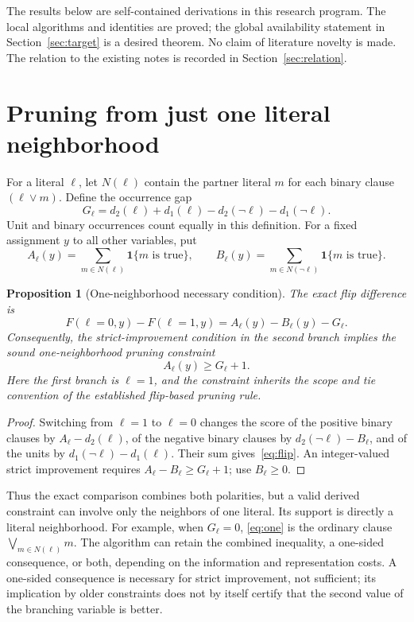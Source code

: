 \documentclass[11pt,a4paper]{article}
\newtheorem{proposition}[theorem]{Proposition}
\theoremstyle{definition}
\newcommand{\ind}[1]{\mathbf 1\{#1\}}
\begin{document}
The results below are self-contained derivations in this research program.
The local algorithms and identities are proved; the global availability
statement in Section~\ref{sec:target} is a desired theorem. No claim of
literature novelty is made. The relation to the existing notes is recorded
in Section~\ref{sec:relation}.

\section{Pruning from just one literal neighborhood}\label{sec:one}

For a literal $\ell$, let $N(\ell)$ contain the partner literal $m$ for
each binary clause $(\ell\lor m)$. Define the occurrence gap
\begin{equation}
 G_\ell=d_2(\ell)+d_1(\ell)-d_2(\neg\ell)-d_1(\neg\ell).
 \label{eq:gap}
\end{equation}
Unit and binary occurrences count equally in this definition. For a fixed
assignment $y$ to all other variables, put
\[
 A_\ell(y)=\sum_{m\in N(\ell)}\ind{m\text{ is true}},\qquad
 B_\ell(y)=\sum_{m\in N(\neg\ell)}\ind{m\text{ is true}}.
\]

\begin{proposition}[One-neighborhood necessary condition]\label{prop:one}
The exact flip difference is
\begin{equation}
 F(\ell=0,y)-F(\ell=1,y)=A_\ell(y)-B_\ell(y)-G_\ell.
 \label{eq:flip}
\end{equation}
Consequently, the strict-improvement condition in the second branch
implies the sound one-neighborhood pruning constraint
\begin{equation}
 \boxed{A_\ell(y)\ge G_\ell+1.} \label{eq:one}
\end{equation}
Here the first branch is $\ell=1$, and the constraint inherits the scope
and tie convention of the established flip-based pruning rule.
\end{proposition}
\begin{proof}
Switching from $\ell=1$ to $\ell=0$ changes the score of the positive
binary clauses by $A_\ell-d_2(\ell)$, of the negative binary clauses by
$d_2(\neg\ell)-B_\ell$, and of the units by
$d_1(\neg\ell)-d_1(\ell)$. Their sum gives~\eqref{eq:flip}.
An integer-valued strict improvement requires
$A_\ell-B_\ell\ge G_\ell+1$; use $B_\ell\ge0$.
\end{proof}

Thus the exact comparison combines both polarities, but a valid derived
constraint can involve only the neighbors of one literal. Its support is
directly a literal neighborhood. For example, when $G_\ell=0$,
\eqref{eq:one} is the ordinary clause $\bigvee_{m\in N(\ell)}m$.
The algorithm can retain the combined inequality, a one-sided consequence,
or both, depending on the information and representation costs. A
one-sided consequence is necessary for strict improvement, not sufficient;
its implication by older constraints does not by itself certify that the
second value of the branching variable is better.
\end{document}
